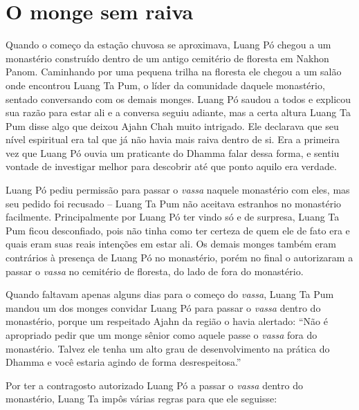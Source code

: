 \chapter{O monge sem raiva}

Quando o começo da estação chuvosa se aproximava, Luang Pó chegou a um
monastério construído dentro de um antigo cemitério de floresta em
Nakhon Panom. Caminhando por uma pequena trilha na floresta ele chegou a
um salão onde encontrou Luang Ta Pum, o líder da comunidade daquele
monastério, sentado conversando com os demais monges. Luang Pó saudou a
todos e explicou sua razão para estar ali e a conversa seguiu adiante,
mas a certa altura Luang Ta Pum disse algo que deixou Ajahn Chah muito
intrigado. Ele declarava que seu nível espiritual era tal que já não
havia mais raiva dentro de si. Era a primeira vez que Luang Pó ouvia um
praticante do Dhamma falar dessa forma, e sentiu vontade de investigar
melhor para descobrir até que ponto aquilo era verdade.

Luang Pó pediu permissão para passar o \emph{vassa} naquele monastério
com eles, mas seu pedido foi recusado -- Luang Ta Pum não aceitava
estranhos no monastério facilmente. Principalmente por Luang Pó ter
vindo só e de surpresa, Luang Ta Pum ficou desconfiado, pois não tinha
como ter certeza de quem ele de fato era e quais eram suas reais
intenções em estar ali. Os demais monges também eram contrários à
presença de Luang Pó no monastério, porém no final o autorizaram a
passar o \emph{vassa} no cemitério de floresta, do lado de fora do
monastério.

Quando faltavam apenas alguns dias para o começo do \emph{vassa}, Luang
Ta Pum mandou um dos monges convidar Luang Pó para passar o \emph{vassa}
dentro do monastério, porque um respeitado Ajahn da região o havia
alertado: ``Não é apropriado pedir que um monge sênior como aquele passe
o \emph{vassa} fora do monastério. Talvez ele tenha um alto grau de
desenvolvimento na prática do Dhamma e você estaria agindo de forma
desrespeitosa.''

Por ter a contragosto autorizado Luang Pó a passar o \emph{vassa} dentro
do monastério, Luang Ta impôs várias regras para que ele seguisse:

